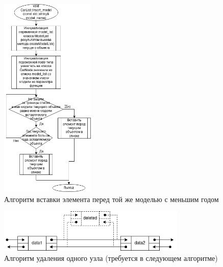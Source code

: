 \documentclass[a4paper, 14pt]{extarticle}
\begin{document}
\begin{figure}[htpb]
  \centering
  \includegraphics[width=0.4\textwidth]{pictures/insert_model_fix.png}
  \caption{Алгоритм вставки элемента перед той же моделью с меньшим годом}
  \label{fig:create_list}
\end{figure}
\begin{figure}[htpb]
  \centering
  \includegraphics[width=0.8\textwidth]{pictures/delete_row.png}
  \caption{Алгоритм удаления одного узла (требуется в следующем алгоритме)}
  \label{fig:create_list}
\end{figure}
\end{document}
